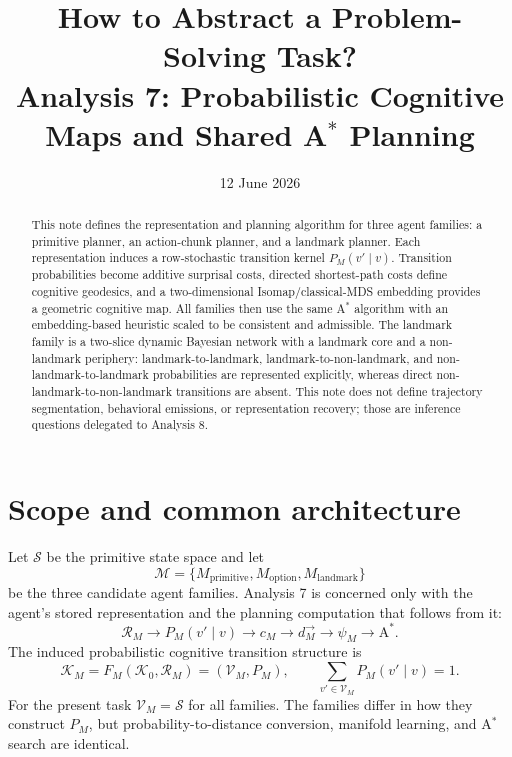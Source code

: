 \documentclass[11pt]{article}
\title{How to Abstract a Problem-Solving Task?\\
\large Analysis 7: Probabilistic Cognitive Maps and Shared A$^\ast$ Planning}
\author{}
\date{12 June 2026}
\begin{document}
\maketitle

\begin{abstract}
This note defines the representation and planning algorithm for three agent families:
a primitive planner, an action-chunk planner, and a landmark planner. Each representation
induces a row-stochastic transition kernel $P_M(v'\mid v)$. Transition probabilities become
additive surprisal costs, directed shortest-path costs define cognitive geodesics, and a
two-dimensional Isomap/classical-MDS embedding provides a geometric cognitive map. All
families then use the same A$^\ast$ algorithm with an embedding-based heuristic scaled to
be consistent and admissible. The landmark family is a two-slice dynamic Bayesian network
with a landmark core and a non-landmark periphery: landmark-to-landmark,
landmark-to-non-landmark, and non-landmark-to-landmark probabilities are represented
explicitly, whereas direct non-landmark-to-non-landmark transitions are absent. This note
does not define trajectory segmentation, behavioral emissions, or representation recovery;
those are inference questions delegated to Analysis 8.
\end{abstract}

\section{Scope and common architecture}

Let $\mathcal S$ be the primitive state space and let
\[
\mathcal M
=
\{M_{\mathrm{primitive}},M_{\mathrm{option}},M_{\mathrm{landmark}}\}
\]
be the three candidate agent families. Analysis 7 is concerned only with the agent's
stored representation and the planning computation that follows from it:
\begin{equation}
\boxed{
\mathcal R_M
\longrightarrow
P_M(v'\mid v)
\longrightarrow
c_M
\longrightarrow
d_M^\to
\longrightarrow
\psi_M
\longrightarrow
\mathrm{A}^{\ast}.
}
\label{eq:architecture}
\end{equation}
The induced probabilistic cognitive transition structure is
\begin{equation}
\mathcal K_M
=
F_M(\mathcal K_0,\mathcal R_M)
=
(\mathcal V_M,P_M),
\qquad
\sum_{v'\in\mathcal V_M}P_M(v'\mid v)=1.
\label{eq:map}
\end{equation}
For the present task $\mathcal V_M=\mathcal S$ for all families. The families differ in
how they construct $P_M$, but probability-to-distance conversion, manifold learning, and
A$^\ast$ search are identical.
\end{document}

